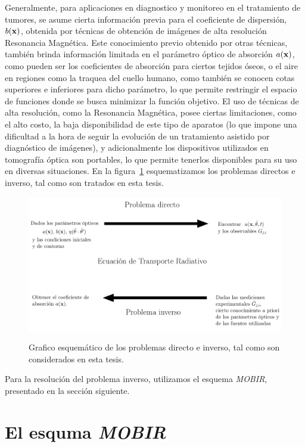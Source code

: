 Generalmente, para aplicaciones 
en diagnostico y monitoreo en el tratamiento de tumores, 
se asume cierta información previa 
para el coeficiente de dispersión, 
$b(\mathbf{x})$, obtenida por técnicas de obtención 
de imágenes de alta resolución~\cite{Althobaiti2017,Guven2003} \eg Resonancia Magnética. 
Este conocimiento previo obtenido por otras técnicas, también brinda 
información limitada en el parámetro óptico de absorción $a(\mathbf{x})$, 
como pueden ser los coeficientes de absorción para ciertos tejidos óseos, 
o el aire en regiones como la traquea del cuello humano, como también 
se conocen cotas superiores e inferiores para dicho parámetro, 
lo que permite restringir el espacio de funciones donde se busca minimizar 
la función objetivo. El uso de técnicas de alta resolución, como la Resonancia 
Magnética, posee ciertas limitaciones, como el alto costo, la baja disponibilidad 
de este tipo de aparatos 
(lo que impone una dificultad a la hora de seguir la evolución de un tratamiento 
asistido por diagnóstico de imágenes), y adicionalmente los dispositivos 
utilizados en tomografía óptica son portables, lo que permite tenerlos disponibles 
para su uso en diversas situaciones. En la figura~\ref{fig:esquemainv} esquematizamos los problemas directos e inverso, tal como son 
tratados en esta tesis. 


\begin{figure}[h!]
\centering
  \includegraphics[width=\linewidth]{figuras/inv.pdf}\\
  \caption{
Grafico esquemático de los problemas directo e inverso, tal como son considerados 
en esta tesis.}
 \label{fig:esquemainv}
\end{figure}
Para la resolución del problema inverso, utilizamos el esquema \textit{MOBIR}, 
presentado en la sección siguiente. 

\pagebreak

\section{El esquma \textit{MOBIR}}

